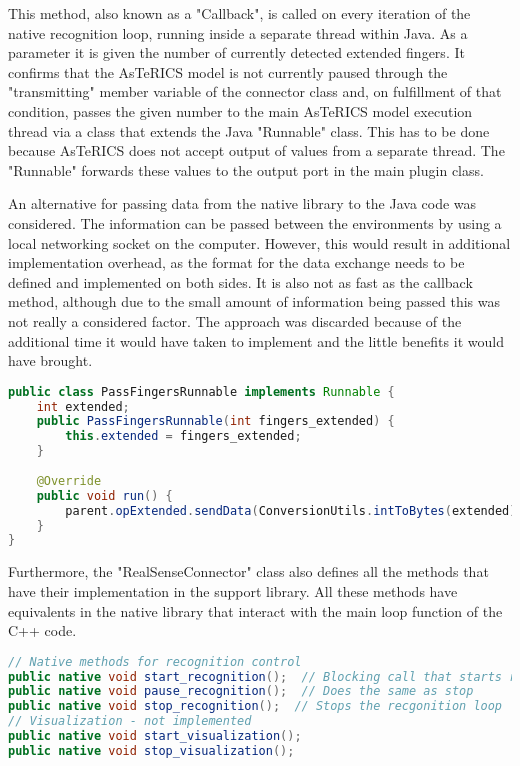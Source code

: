 \documentclass[BSA,Bachelor,english]{twbook}%
\begin{document}
This method, also known as a "Callback", is called on every iteration of the native recognition loop, running inside a separate thread within Java. As a parameter it is given the number of currently detected extended fingers. It confirms that the AsTeRICS model is not currently paused through the "transmitting" member variable of the connector class and, on fulfillment of that condition, passes the given number to the main AsTeRICS model execution thread via a class that extends the Java "Runnable" class. This has to be done because AsTeRICS does not accept output of values from a separate thread. The "Runnable" forwards these values to the output port in the main plugin class.

An alternative for passing data from the native library to the Java code was considered. The information can be passed between the environments by using a local networking socket on the computer. However, this would result in additional implementation overhead, as the format for the data exchange needs to be defined and implemented on both sides. It is also not as fast as the callback method, although due to the small amount of information being passed this was not really a considered factor. The approach was discarded because of the additional time it would have taken to implement and the little benefits it would have brought.

\begin{lstlisting}[language=Java,name={Forwarding runnable},label={rs:javaplugin:5}]
public class PassFingersRunnable implements Runnable {
	int extended;
	public PassFingersRunnable(int fingers_extended) {
		this.extended = fingers_extended;
	}
	
	@Override
	public void run() {
		parent.opExtended.sendData(ConversionUtils.intToBytes(extended));
	}
}
\end{lstlisting}

Furthermore, the "RealSenseConnector" class also defines all the methods that have their implementation in the support library. All these methods have equivalents in the native library that interact with the main loop function of the C++ code.

\begin{lstlisting}[language=Java,name={Java Native Interface methods},label={rs:javaplugin:4}]
// Native methods for recognition control
public native void start_recognition();  // Blocking call that starts recognition loop
public native void pause_recognition();  // Does the same as stop
public native void stop_recognition();  // Stops the recgonition loop
// Visualization - not implemented
public native void start_visualization();
public native void stop_visualization();
\end{lstlisting}
\end{document}
